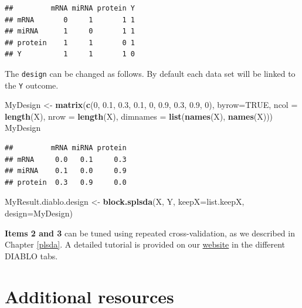 \documentclass[]{book}
\newenvironment{Shaded}{\begin{snugshade}}{\end{snugshade}}
\newcommand{\DataTypeTok}[1]{\textcolor[rgb]{0.13,0.29,0.53}{#1}}
\newcommand{\DecValTok}[1]{\textcolor[rgb]{0.00,0.00,0.81}{#1}}
\newcommand{\FloatTok}[1]{\textcolor[rgb]{0.00,0.00,0.81}{#1}}
\newcommand{\KeywordTok}[1]{\textcolor[rgb]{0.13,0.29,0.53}{\textbf{#1}}}
\newcommand{\NormalTok}[1]{#1}
\newcommand{\OtherTok}[1]{\textcolor[rgb]{0.56,0.35,0.01}{#1}}
\newcommand{\StringTok}[1]{\textcolor[rgb]{0.31,0.60,0.02}{#1}}
\begin{document}
\begin{verbatim}
##         mRNA miRNA protein Y
## mRNA       0     1       1 1
## miRNA      1     0       1 1
## protein    1     1       0 1
## Y          1     1       1 0
\end{verbatim}

The \texttt{design} can be changed as follows. By default each data set will be linked to the \texttt{Y} outcome.

\begin{Shaded}
\begin{Highlighting}[]
\NormalTok{MyDesign <-}\StringTok{ }\KeywordTok{matrix}\NormalTok{(}\KeywordTok{c}\NormalTok{(}\DecValTok{0}\NormalTok{, }\FloatTok{0.1}\NormalTok{, }\FloatTok{0.3}\NormalTok{,}
                     \FloatTok{0.1}\NormalTok{, }\DecValTok{0}\NormalTok{, }\FloatTok{0.9}\NormalTok{,}
                     \FloatTok{0.3}\NormalTok{, }\FloatTok{0.9}\NormalTok{, }\DecValTok{0}\NormalTok{),}
                   \DataTypeTok{byrow=}\OtherTok{TRUE}\NormalTok{,}
                   \DataTypeTok{ncol =} \KeywordTok{length}\NormalTok{(X), }\DataTypeTok{nrow =} \KeywordTok{length}\NormalTok{(X),}
                 \DataTypeTok{dimnames =} \KeywordTok{list}\NormalTok{(}\KeywordTok{names}\NormalTok{(X), }\KeywordTok{names}\NormalTok{(X)))}
\NormalTok{MyDesign}
\end{Highlighting}
\end{Shaded}

\begin{verbatim}
##         mRNA miRNA protein
## mRNA     0.0   0.1     0.3
## miRNA    0.1   0.0     0.9
## protein  0.3   0.9     0.0
\end{verbatim}

\begin{Shaded}
\begin{Highlighting}[]
\NormalTok{MyResult.diablo.design <-}\StringTok{ }\KeywordTok{block.splsda}\NormalTok{(X, Y, }\DataTypeTok{keepX=}\NormalTok{list.keepX, }\DataTypeTok{design=}\NormalTok{MyDesign)}
\end{Highlighting}
\end{Shaded}

\textbf{Items 2 and 3} can be tuned using repeated cross-validation, as we described in Chapter \ref{plsda}. A detailed tutorial is provided on our \href{http://mixomics.org/mixdiablo/}{website} in the different DIABLO tabs.

\hypertarget{additional-resources-3}{%
\section{Additional resources}\label{additional-resources-3}}
\end{document}
